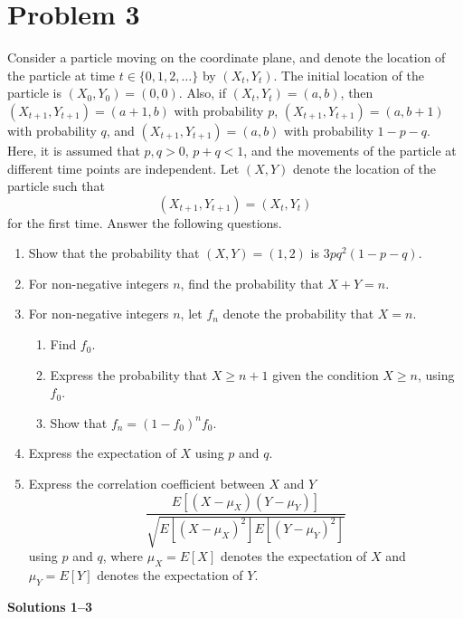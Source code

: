 \documentclass[10pt,a4paper]{article}
\begin{document}
\section*{Problem 3}

Consider a particle moving on the coordinate plane, and denote the location of the particle at time $t\in\{0,1,2,\ldots\}$ by $(X_t,Y_t)$. The initial location of the particle is $(X_0,Y_0)=(0,0)$. Also, if $(X_t,Y_t)=(a,b)$, then $(X_{t+1},Y_{t+1})=(a+1,b)$ with probability $p$, $(X_{t+1},Y_{t+1})=(a,b+1)$ with probability $q$, and $(X_{t+1},Y_{t+1})=(a,b)$ with probability $1-p-q$. Here, it is assumed that $p,q>0$, $p+q<1$, and the movements of the particle at different time points are independent. Let $(X,Y)$ denote the location of the particle such that
\[
  (X_{t+1},Y_{t+1})=(X_t,Y_t)
\]
for the first time. Answer the following questions.

\begin{enumerate}
  \item Show that the probability that $(X,Y)=(1,2)$ is $3pq^2(1-p-q)$.

  \item For non-negative integers $n$, find the probability that $X+Y=n$.

  \item For non-negative integers $n$, let $f_n$ denote the probability that $X=n$.
        \begin{enumerate}
          \item Find $f_0$.
          \item Express the probability that $X\geq n+1$ given the condition $X\geq n$, using $f_0$.
          \item Show that $f_n=(1-f_0)^nf_0$.
        \end{enumerate}

  \item Express the expectation of $X$ using $p$ and $q$.

  \item Express the correlation coefficient between $X$ and $Y$
        \[
          \frac{E[(X-\mu_X)(Y-\mu_Y)]}
          {\sqrt{E[(X-\mu_X)^2]E[(Y-\mu_Y)^2]}}
        \]
        using $p$ and $q$, where $\mu_X=E[X]$ denotes the expectation of $X$ and $\mu_Y=E[Y]$ denotes the expectation of $Y$.
\end{enumerate}

\newpage

\begin{center}
  {\Large \textbf{Solutions 1--3}}
\end{center}
\end{document}
